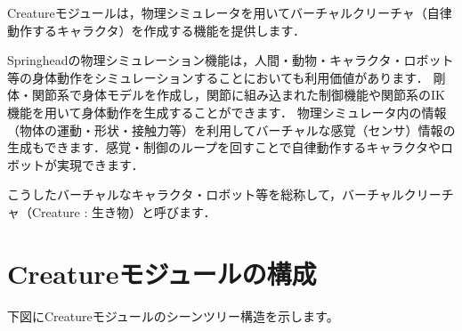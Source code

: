 \begin{chapterabstract}
Creature\KLUDGE モジュールは，物理シミュレータを用いてバーチャルクリーチャ（自律動作するキャラクタ）を作成する機能を提供します．

Springhead\KLUDGE の物理シミュレーション機能は，人間・動物・キャラクタ・ロボット等の身体動作をシミュレーションすることにおいても利用価値があります．
\KLUDGE 剛体・関節系で身体モデルを作成し，関節に組み込まれた制御機能や関節系のIK\KLUDGE 機能を用いて身体動作を生成することができます．
\KLUDGE 物理シミュレータ内の情報（物体の運動・形状・接触力等）を利用してバーチャルな感覚（センサ）情報の生成もできます．感覚・制御のループを回すことで自律動作するキャラクタやロボットが実現できます．

\KLUDGE こうしたバーチャルなキャラクタ・ロボット等を総称して，バーチャルクリーチャ（Creature : \KLUDGE 生き物）と呼びます．
\end{chapterabstract}

%




%


%
% 

\section{Creature\KLUDGE モジュールの構成}

\KLUDGE 下図にCreature\KLUDGE モジュールのシーンツリー構造を示します。

